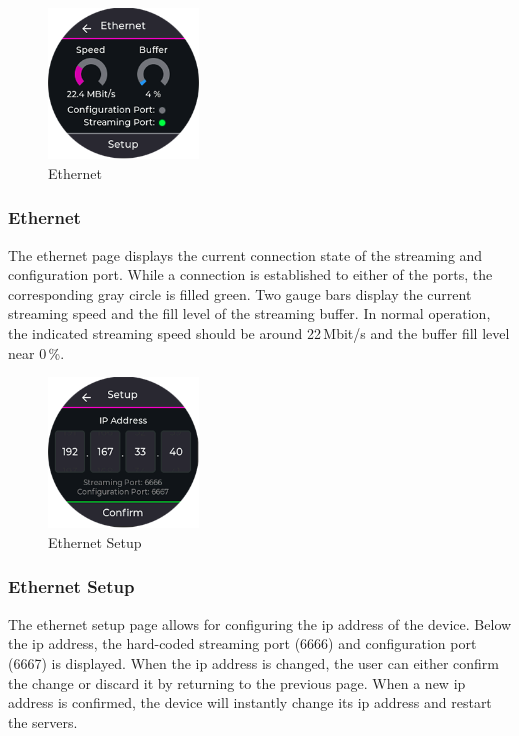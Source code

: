 \begin{minipage}{\linewidth}
	\begin{figure}
		\vspace{-0.6cm}
		\includegraphics[width=4cm]{images/6_design_final/gui/04_ethernet.png}
		\centering
		\caption{Ethernet}
		\label{fig:final_design_gui_ethernet}
	\end{figure}
	\subsubsection{Ethernet}
	The ethernet page displays the current connection state of the streaming and configuration port.
	While a connection is established to either of the ports, the corresponding gray circle is filled green.
	Two gauge bars display the current streaming speed and the fill level of the streaming buffer.
	In normal operation, the indicated streaming speed should be around 22\,Mbit/s and the buffer fill level near 0\,\%.
\end{minipage}
\newpage

\begin{minipage}{\linewidth}
	\begin{figure}
		\vspace{-0.6cm}
		\includegraphics[width=4cm]{images/6_design_final/gui/05_ethernet_config.png}
		\centering
		\caption{Ethernet Setup}
		\label{fig:final_design_gui_ethernet_setup}
	\end{figure}
	\subsubsection{Ethernet Setup}
	The ethernet setup page allows for configuring the \acrshort{ip} address  of the device.
	Below the \acrshort{ip} address, the hard-coded streaming port (6666) and configuration port (6667) is displayed.
	When the \acrshort{ip} address is changed, the user can either confirm the change or discard it by returning to the previous page.
	When a new \acrshort{ip} address is confirmed, the device will instantly change its \acrshort{ip} address and restart the servers.
\end{minipage}
\vspace{0.2cm}

